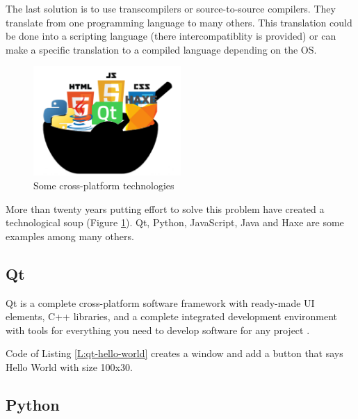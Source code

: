 The last solution is to use transcompilers or source-to-source compilers.
They translate from one programming language to many others. This translation
could be done into a scripting language (there intercompatiblity is provided) or
can make a specific translation to a compiled language depending on the OS.

\begin{figure}[htb]
	\begin{center}
		\includegraphics[width=0.5\textwidth]{./figures/techsoup.png}
		\caption{Some cross-platform technologies}
		\label{F:tech-soup}
	\end{center}
\end{figure}

More than twenty years putting effort to solve this problem have created a 
technological soup (Figure \ref{F:tech-soup}). Qt, Python, JavaScript, Java and 
Haxe are some examples among many others.

\subsection{Qt}

Qt is a complete cross-platform software framework with ready-made UI elements,
C++ libraries, and a complete integrated development environment with tools for 
everything you need to develop software for any project \cite{qt-web}.

\begin{codefigure}
\end{codefigure}

Code of Listing \ref{L:qt-hello-world} creates a window and add a button that
says Hello World with size 100x30.

\subsection{Python}

